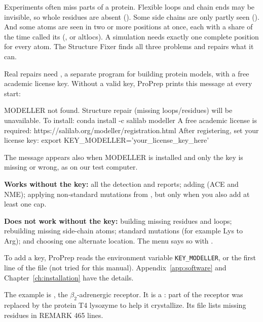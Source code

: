 Experiments often miss parts of a protein. Flexible loops and chain ends may be
invisible, so whole residues are absent (). Some side
chains are only partly seen (). And some atoms are seen in
two or more positions at once, each with a share of the time called its
 (, or altlocs). A simulation needs
exactly one complete position for every atom. The Structure Fixer finds all
three problems and repairs what it can.

\begin{needsoftware}
Real repairs need , a separate program for building protein
models, with a free academic license key. Without a valid key, ProPrep prints
this message at every start:
\begin{screen}
MODELLER not found. Structure repair (missing loops/residues) will be
unavailable.
  To install: conda install -c salilab modeller
  A free academic license is required:
https://salilab.org/modeller/registration.html
  After registering, set your license key:
    export KEY_MODELLER='your_license_key_here'
\end{screen}
The message appears also when MODELLER is installed and only the key is missing
or wrong, as on our test computer.

\textbf{Works without the key:} all the detection and reports; adding
 (ACE and NME); applying non-standard mutations from
, but only when you also add at least one cap.

\textbf{Does not work without the key:} building missing residues and loops;
rebuilding missing side-chain atoms; standard mutations (for example Lys to
Arg); and choosing one alternate location. The menu says so with
.

To add a key, ProPrep reads the environment variable \texttt{KEY\_MODELLER}, or
the first line of the file  (not tried for this
manual). Appendix~\ref{app:software} and Chapter~\ref{ch:installation} have
the details.
\end{needsoftware}

The example is , the $\beta_2$-adrenergic receptor. It is a
: part of the receptor was replaced by the protein T4 lysozyme to
help it crystallize. Its file lists missing residues in REMARK 465 lines.

